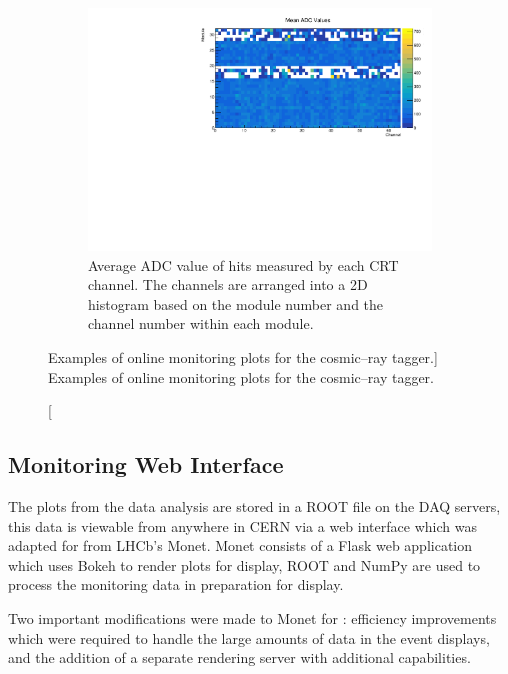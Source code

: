 \begin{figure}
	\begin{subfigure}[b]{0.8\textwidth}
		\centering
		\vspace{3mm}
		\includegraphics[width=\textwidth]{figures/crt_adc_om.pdf}
		\caption {Average ADC value of hits measured by each CRT channel. The 
		channels are arranged into a 2D histogram based on the module number and the 
		channel number within each module.}
		\label{fig:crt_adc_om}
	\end{subfigure}

	\caption
	[Examples of online monitoring plots for the cosmic--ray tagger.]
	{Examples of online monitoring plots for the cosmic--ray tagger.}
	\label{fig:crt_OM}

\end{figure}

\subsection{Monitoring Web Interface}
The plots from the data analysis are stored in a ROOT file on the \protodune{}
DAQ servers, this data is viewable from anywhere in CERN via a web interface
which was adapted for \protodune{} from LHCb's Monet\cite{Adinolfi_2017}. 
Monet consists of a Flask web application\cite{flask} which uses 
Bokeh\cite{bokeh} to render plots for display, ROOT\cite{ANTCHEVA20092499} and 
NumPy\cite{numpy} are used to process the monitoring data in preparation for 
display.

Two important modifications were made to Monet for \protodune{}: efficiency 
improvements which were required to handle the large amounts of data in the 
event displays, and the addition of a separate rendering server with 
additional capabilities. 

